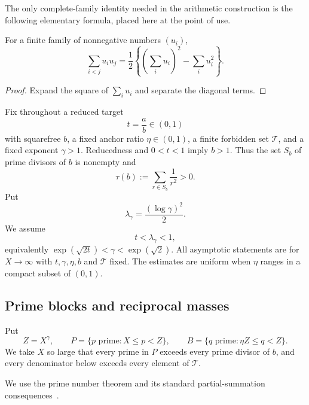 The only complete-family identity needed in the arithmetic construction is the following elementary formula, placed here at the point of use.

\begin{lemma}
\label{lem:complete-pair-identity}
For a finite family of nonnegative numbers $(u_i)$,
\[
 \sum_{i<j}u_i u_j
 =\frac12\left\{\left(\sum_i u_i\right)^2-\sum_i u_i^2\right\}.
\]
\end{lemma}
\begin{proof}
Expand the square of $\sum_i u_i$ and separate the diagonal terms.
\end{proof}

\label{sec:denominator-system}

Fix throughout a reduced target
\[
 t=\frac ab\in(0,1)
\]
with squarefree $b$, a fixed anchor ratio $\eta\in(0,1)$, a finite forbidden set $\mathcal T$, and a fixed exponent $\gamma>1$. Reducedness and $0<t<1$ imply $b>1$. Thus the set $S_b$ of prime divisors of $b$ is nonempty and
\begin{equation}
\label{eq:tau-positive}
 \tau(b):=\sum_{r\in S_b}\frac1{r^2}>0.
\end{equation}
Put
\begin{equation}
\label{eq:lambda-gamma}
 \lambda_\gamma=\frac{(\log\gamma)^2}{2}.
\end{equation}
We assume
\begin{equation}
\label{eq:admissible-region}
 t<\lambda_\gamma<1,
\end{equation}
equivalently $\exp(\sqrt{2t})<\gamma<\exp(\sqrt2)$. All asymptotic statements are for $X\to\infty$ with $t,\gamma,\eta,b$ and $\mathcal T$ fixed. The estimates are uniform when $\eta$ ranges in a compact subset of $(0,1)$.

\subsection{Prime blocks and reciprocal masses}

Put
\begin{equation}
\label{eq:prime-blocks}
 Z=X^\gamma,
 \qquad P=\{p\text{ prime}:X\leq p<Z\},
 \qquad B=\{q\text{ prime}:\eta Z\leq q<Z\}.
\end{equation}
We take $X$ so large that every prime in $P$ exceeds every prime divisor of $b$, and every denominator below exceeds every element of $\mathcal T$.

We use the prime number theorem and its standard partial-summation consequences~\cite[Chapter~1]{montgomery-vaughan-2007}.

